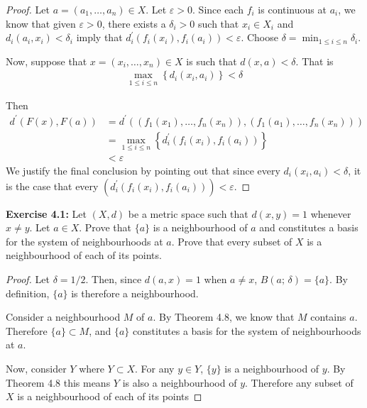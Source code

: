 \documentclass{article}
\begin{document}
\begin{proof}
    Let $a = (a_1, \dots, a_n) \in X$. Let $\varepsilon > 0$. Since each $f_i$ is continuous at $a_i$, we know that
    given $\varepsilon > 0$, there exists a $\delta_i > 0$ such that $x_i \in X_i$ and $d_i(a_i, x_i) < \delta_i$ imply that
    $d^\prime_i(f_i(x_i), f_i(a_i)) < \varepsilon$. Choose $\delta = \min_{1 \le i \le n} \delta_i$.

    Now, suppose that $x = (x_i, \dots, x_n) \in X$ is such that $d(x, a) < \delta$. That is
    \begin{align*}
        \max_{1 \le i \le n} \left\{d_i(x_i, a_i)\right\} < \delta
    \end{align*}

    Then
    \begin{align*}
        d^\prime(F(x), F(a)) &= d^\prime((f_1(x_1), \dots, f_n(x_n)), (f_1(a_1), \dots, f_n(x_n)))\\
        &= \max_{1 \le i \le n} \left\{d^\prime_i(f_i(x_i), f_i(a_i))\right\}\\
        &< \varepsilon
    \end{align*}
    We justify the final conclusion by pointing out that since every $d_i(x_i, a_i) < \delta$, it is the case
    that every $(d^\prime_i(f_i(x_i), f_i(a_i))) < \varepsilon$.
\end{proof}
\pagebreak

\textbf{Exercise 4.1:} Let $(X, d)$ be a metric space such that $d(x, y) = 1$ whenever $x \ne y$. Let $a \in X$. Prove that $\{a\}$ is a
neighbourhood of $a$ and constitutes a basis for the system of neighbourhoods at $a$. Prove that every subset of $X$ is a neighbourhood
of each of its points.

\begin{proof}
    Let $\delta = 1/2$. Then, since $d(a, x) = 1$ when $a \ne x$, $B(a;\,\delta) = \{a\}$. By definition,
    $\{a\}$ is therefore a neighbourhood.

    Consider a neighbourhood $M$ of $a$. By Theorem 4.8, we know that $M$ contains $a$. Therefore $\{a\} \subset M$, and 
    $\{a\}$ constitutes a basis for the system of neighbourhoods at $a$.

    Now, consider $Y$ where $Y \subset X$. For any $y \in Y$, $\{y\}$ is a neighbourhood of $y$. By Theorem 4.8 this means $Y$
    is also a neighbourhood of $y$. Therefore any subset of $X$ is a neighbourhood of each of its points
\end{proof}
\end{document}
